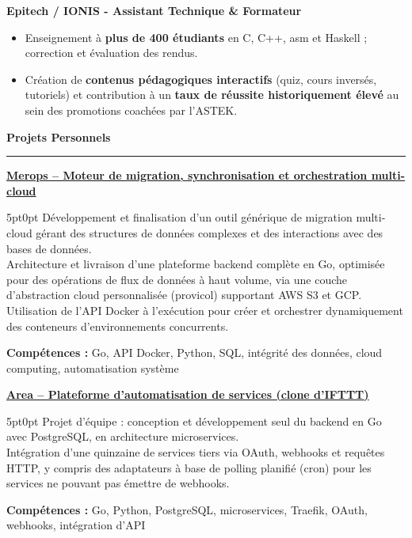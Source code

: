 \documentclass[9pt]{extarticle}
\begin{document}
\par\vspace{5pt}

{\bfseries Epitech / IONIS - Assistant Technique \& Formateur}
\begin{itemize}[noitemsep, topsep=0pt]
	\item Enseignement à {\bfseries plus de 400 étudiants} en C, C++, asm et Haskell ; correction et évaluation des rendus.
	\item Création de {\bfseries contenus pédagogiques interactifs} (quiz, cours inversés, tutoriels) et contribution à un {\bfseries taux de réussite historiquement élevé} au sein des promotions coachées par l'ASTEK.
\end{itemize}

\par\vspace{5pt}

{\large\bfseries Projets Personnels}
\par\vspace{-8pt}
\rule{\linewidth}{0.4pt}
\par\vspace{5pt}

\underline{\bfseries Merops -- Moteur de migration, synchronisation et orchestration multi-cloud}
\par
\begin{adjustwidth}{5pt}{0pt}
    Développement et finalisation d'un outil générique de migration multi-cloud gérant des structures de données complexes et des interactions avec des bases de données. \\
    Architecture et livraison d'une plateforme backend complète en Go, optimisée pour des opérations de flux de données à haut volume, via une couche d'abstraction cloud personnalisée ({\ttfamily provicol}) supportant AWS S3 et GCP. \\
    Utilisation de l'API Docker à l'exécution pour créer et orchestrer dynamiquement des conteneurs d'environnements concurrents.
\end{adjustwidth}
\par
{\bfseries Compétences :} Go, API Docker, Python, SQL, intégrité des données, cloud computing, automatisation système

\par\vspace{8pt}

\underline{\bfseries Area -- Plateforme d'automatisation de services (clone d'IFTTT)}
\par
\begin{adjustwidth}{5pt}{0pt}
    Projet d'équipe : conception et développement seul du backend en Go avec PostgreSQL, en architecture microservices. \\
    Intégration d'une quinzaine de services tiers via OAuth, webhooks et requêtes HTTP, y compris des adaptateurs à base de polling planifié (cron) pour les services ne pouvant pas émettre de webhooks.
\end{adjustwidth}
\par
{\bfseries Compétences :} Go, Python, PostgreSQL, microservices, Traefik, OAuth, webhooks, intégration d'API
\end{document}

